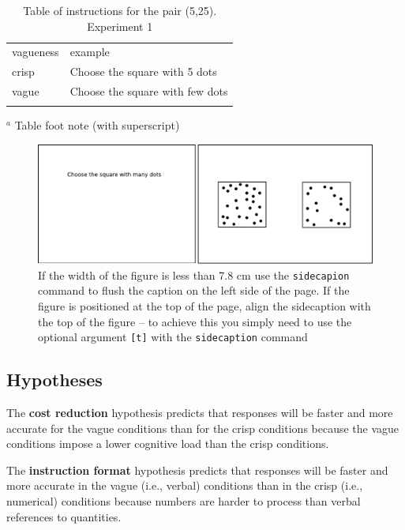 \begin{table}
\caption{Table of instructions for the pair (5,25). Experiment 1}
\label{instructionse1} 
\begin{tabular}{| l | l |}
\hline\noalign{\smallskip}
vagueness&example\\
\noalign{\smallskip}\svhline\noalign{\smallskip}
crisp 	& 	Choose the square with 5 dots \\
vague	&	Choose the square with few dots\\
\noalign{\smallskip}\hline\noalign{\smallskip}
\end{tabular}
$^a$ Table foot note (with superscript)\\
\end{table}

\begin{figure}[b]
\sidecaption
\includegraphics[scale=.65]{images/stimuluse1}
\caption{If the width of the figure is less than 7.8 cm use the \texttt{sidecapion} command to flush the caption on the left side of the page. If the figure is positioned at the top of the page, align the sidecaption with the top of the figure -- to achieve this you simply need to use the optional argument \texttt{[t]} with the \texttt{sidecaption} command}
\label{stimuluse1}
\end{figure}

\subsection{Hypotheses}
The {\bf cost reduction} hypothesis predicts that responses will be faster and more accurate for the vague conditions than for the crisp conditions because the vague conditions impose a lower cognitive load than the crisp conditions. 

The {\bf instruction format} hypothesis predicts that responses will be faster and more accurate in the vague (i.e., verbal) conditions than in the crisp (i.e., numerical) conditions because numbers are harder to process than verbal references to quantities.

